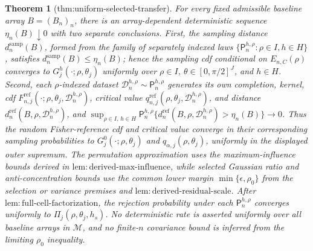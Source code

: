 \documentclass{article}
\newtheorem{theorem}{Theorem}
\begin{document}
\begin{theorem}[thm:uniform-selected-transfer]\label{thm:uniform-selected-transfer}
For every fixed admissible baseline array \(B=(B_n)_n\), there is an array-dependent deterministic sequence \(\eta_n(B)\downarrow0\) with two separate conclusions. First, the sampling distance \(d_n^{\mathrm{samp}}(B)\), formed from the family of separately indexed laws \(\{\mathsf P_n^{h,\rho}:\rho\in I,h\in H\}\), satisfies \(d_n^{\mathrm{samp}}(B)\le\eta_n(B)\); hence the sampling cdf conditional on \(E_{n,C}(\rho)\) converges to \(G_j^h(\cdot;\rho,\theta_j)\) uniformly over \(\rho\in I\), \(\theta\in[0,\pi/2]^J\), and \(h\in H\). Second, each \(\rho\)-indexed dataset \(\mathcal D_n^{h,\rho}\sim\mathsf P_n^{h,\rho}\) generates its own completion, kernel, cdf \(F^{\mathrm{ref}}_{n,j}(\cdot;\rho,\theta_j,\mathcal D_n^{h,\rho})\), critical value \(q^{\mathrm{ref}}_{n,j}(\rho,\theta_j,\mathcal D_n^{h,\rho})\), and distance \(d_n^{\mathrm{ref}}(B,\rho,\mathcal D_n^{h,\rho})\), and \(\sup_{\rho\in I,\,h\in H}\mathsf P_n^{h,\rho}\{d_n^{\mathrm{ref}}(B,\rho,\mathcal D_n^{h,\rho})>\eta_n(B)\}\to0\). Thus the random Fisher-reference cdf and critical value converge in their corresponding sampling probabilities to \(G_j^0(\cdot;\rho,\theta_j)\) and \(q_{\alpha,j}(\rho,\theta_j)\), uniformly in the displayed outer supremum. The permutation approximation uses the maximum-influence bounds derived in \(\mathrm{lem{:}derived\mbox{-}max\mbox{-}influence}\), while selected Gaussian ratio and anti-concentration bounds use the common lower margin \(\min\{\epsilon,\rho_0\}\) from the selection or variance premises and \(\mathrm{lem{:}derived\mbox{-}residual\mbox{-}scale}\). After \(\mathrm{lem{:}full\mbox{-}cell\mbox{-}factorization}\), the rejection probability under each \(\mathsf P_n^{h,\rho}\) converges uniformly to \(\Pi_j(\rho,\theta_j,h_s)\). No deterministic rate is asserted uniformly over all baseline arrays in \(\mathcal M\), and no finite-\(n\) covariance bound is inferred from the limiting \(\rho_0\) inequality.
\end{theorem}
\end{document}
